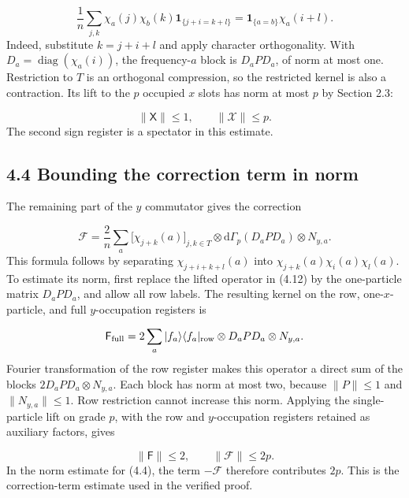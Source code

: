 \documentclass[11pt,a4paper]{article}
\begin{document}
\begin{equation}
\frac1n\sum_{j,k}\chi_a(j)\chi_b(k)
\mathbf1_{\{j+i=k+l\}}
=\mathbf1_{\{a=b\}}\chi_a(i+l).
\tag{4.10}
\end{equation}
Indeed, substitute \(k=j+i+l\) and apply character orthogonality. With \(D_a=\operatorname{diag}(\chi_a(i))\), the frequency-\(a\) block is \(D_aPD_a\), of norm at most one. Restriction to \(T\) is an orthogonal compression, so the restricted kernel is also a contraction. Its lift to the \(p\) occupied \(x\) slots has norm at most \(p\) by Section 2.3:

\begin{equation}
\|\mathsf X\|\le1,
\qquad \|\mathcal X\|\le p.
\tag{4.11}
\end{equation}
The second sign register is a spectator in this estimate.

\subsection*{4.4 Bounding the correction term in norm}
The remaining part of the \(y\) commutator gives the correction

\begin{equation}
\mathcal F=\frac2n\sum_a
\big[\chi_{j+k}(a)\big]_{j,k\in T}
\otimes\mathrm d\Gamma_p(D_aPD_a)\otimes N_{y,a}.
\tag{4.12}
\end{equation}
This formula follows by separating \(\chi_{j+i+k+l}(a)\) into \(\chi_{j+k}(a)\chi_i(a)\chi_l(a)\). To estimate its norm, first replace the lifted operator in (4.12) by the one-particle matrix \(D_aPD_a\), and allow all row labels. The resulting kernel on the row, one-\(x\)-particle, and full \(y\)-occupation registers is

\begin{equation*}
\mathsf F_{\rm full}
=2\sum_a |f_a\rangle\langle f_a|_{\rm row}
\otimes D_aPD_a\otimes N_{y,a}.
\end{equation*}
Fourier transformation of the row register makes this operator a direct sum of the blocks \(2D_aPD_a\otimes N_{y,a}\). Each block has norm at most two, because \(\|P\|\le1\) and \(\|N_{y,a}\|\le1\). Row restriction cannot increase this norm. Applying the single-particle lift on grade \(p\), with the row and \(y\)-occupation registers retained as auxiliary factors, gives

\begin{equation}
\|\mathsf F\|\le2,
\qquad \boxed{\|\mathcal F\|\le2p.}
\tag{4.13}
\end{equation}
In the norm estimate for (4.4), the term \(-\mathcal F\) therefore contributes \(2p\). This is the correction-term estimate used in the verified proof.
\end{document}
